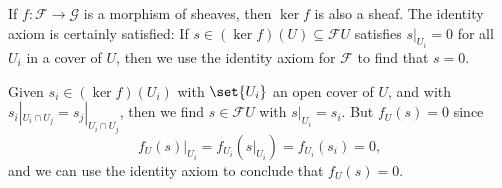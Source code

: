 If $f\colon \mathcal{F}\to \mathcal{G}$ is a morphism of sheaves, then $\ker f$ is
also a sheaf. The identity axiom is certainly satisfied: If $s \in (\ker f)(U) \subseteq \mathcal{F}U$
satisfies $s|_{U_i} = 0$ for all $U_i$ in a cover of $U$, then we use the identity axiom
for $\mathcal{F}$ to find that $s = 0$.

Given $s_i \in (\ker f)(U_i)$ with $\set{U_i}$ an open cover of $U$, and with
$s_i|_{U_i\cap U_j} = s_j|_{U_i\cap U_j}$, then we find $s \in \mathcal{F}U$ with
$s|_{U_i} = s_i$. But $f_U(s) = 0$ since
\[ f_U(s)|_{U_i} = f_{U_i}(s|_{U_i}) = f_{U_i}(s_i) = 0, \]
and we can use the identity axiom to conclude that $f_U(s) = 0$.

